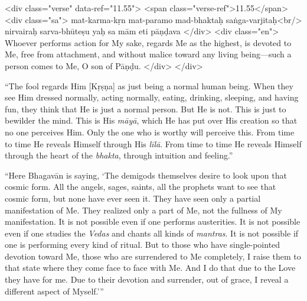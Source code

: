\begin{html}
<div class="verse" data-ref="11.55">
  <span class="verse-ref">11.55</span>
  <div class="sa">
    mat-karma-kṛn mat-paramo mad-bhaktaḥ saṅga-varjitaḥ<br/>
    nirvairaḥ sarva-bhūteṣu yaḥ sa mām eti pāṇḍava
  </div>
  <div class="en">
    Whoever performs action for My sake, regards Me as the highest, is devoted to Me, free from attachment, and without malice toward any living being---such a person comes to Me, O son of Pāṇḍu.
  </div>
</div>
\end{html}


\enquote{The fool regards Him [Kṛṣṇa] as just being a normal human being. When they see Him dressed normally, acting normally, eating, drinking, sleeping, and having fun, they think that He is just a normal person. But He is not. This is just to bewilder the mind. This is His \textit{māyā}, which He has put over His creation so that no one perceives Him. Only the one who is worthy will perceive this. From time to time He reveals Himself through His \textit{līlā}. From time to time He reveals Himself through the heart of the \textit{bhakta}, through intuition and feeling.}

\enquote{Here Bhagavān is saying, \enquote{The demigods themselves desire to look upon that cosmic form. All the angels, sages, saints, all the prophets want to see that cosmic form, but none have ever seen it. They have seen only a partial manifestation of Me. They realized only a part of Me, not the fullness of My manifestation. It is not possible even if one performs austerities. It is not possible even if one studies the \textit{Vedas} and chants all kinds of \textit{mantras}. It is not possible if one is performing every kind of ritual. But to those who have single-pointed devotion toward Me, those who are surrendered to Me completely, I raise them to that state where they come face to face with Me. And I do that due to the Love they have for me. Due to their devotion and surrender, out of grace, I reveal a different aspect of Myself.}}